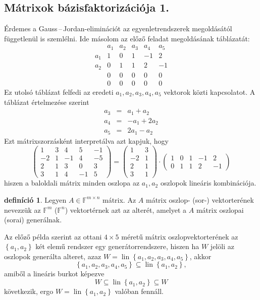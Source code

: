 \documentclass[a4paper, showtrims]{memoir}
\theoremstyle{plain}
\theoremstyle{remark}
\theoremstyle{definition}
\newtheorem{definition}[proposition]{definíció}
\DeclareMathOperator{\lin}{lin}
\begin{document}
\subsection{Mátrixok bázisfaktorizációja 1.}
Érdemes a Gauss\,--\,Jordan-eliminációt  az egyenletrendszerek megoldásától függetlenül is szemlélni.
Ide másolom az előző feladat megoldásának táblázatát:
\[
	\begin{array}{r|rrrrr}
		    & a_1 & a_2 & a_3 & a_4 & a_5 \\
		\hline
		a_1 & 1   & 0   & 1   & -1  & 2   \\
		a_2 & 0   & 1   & 1   & 2   & -1  \\
		    & 0   & 0   & 0   & 0   & 0   \\
		    & 0   & 0   & 0   & 0   & 0
	\end{array}
\]
Ez utolsó táblázat felfedi az eredeti $a_1,a_2,a_3,a_4,a_5$ vektorok közti kapcsolatot.
A táblázat értelmezése szerint
\begin{eqnarray*}
	a_3&=& a_1+a_2\\
	a_4&=& -a_1+2a_2\\
	a_5&=& 2a_1-a_2
\end{eqnarray*}
Ezt mátrixszorzásként interpretálva azt kapjuk, hogy
\[
	\begin{pmatrix}
		1  & 3 & 4  & 5  & -1 \\
	   -2  & 1 & -1 & 4  & -5 \\
		2  & 1 & 3  & 0  & 3  \\
		3  & 1 & 4  & -1 & 5
	\end{pmatrix}
	=
	\begin{pmatrix}
		1  & 3 \\
		-2 & 1 \\
		2  & 1 \\
		3  & 1
	\end{pmatrix}
	\cdot
	\begin{pmatrix}
		1 & 0 & 1 & -1 & 2  \\
		0 & 1 & 1 & 2  & -1
	\end{pmatrix}
    \tag{\dag}\label{bazisfakt}
\]
hiszen a baloldali mátrix minden oszlopa az $a_1,a_2$ oszlopok lineáris kombinációja.

\begin{definition}
	Legyen $A\in\mathbb{F}^{m\times n}$ mátrix.
    Az $A$ mátrix oszlop- (sor-) vektorterének nevezzük az $\mathbb{F}^m$ ($\mathbb{F}^n$) vektortérnek azt az alterét, amelyet a $A$ mátrix oszlopai (sorai) generálnak.
\end{definition}
Az előző példa szerint az ottani $4\times 5$ méretű mátrix oszlopvektorterének az $\left\{ a_1,a_2 \right\}$ két elemű rendszer
egy generátorrendszere, hiszen ha $W$ jelöli az oszlopok generálta alteret, azaz
\(W=\lin\left\{ a_1,a_2,a_3,a_4,a_5 \right\}\), akkor 
\[
    \left\{ a_1,a_2,a_3,a_4,a_5 \right\}\subseteq
    \lin{\left\{ a_1,a_2\right\}},
\]
amiből a lineáris burkot képezve
\[
    W
    \subseteq
    \lin{\left\{ a_1,a_2\right\}}
    \subseteq
    W
\]
következik, ergo $W=\lin\left\{ a_1,a_2 \right\}$ valóban fennáll.
\end{document}
